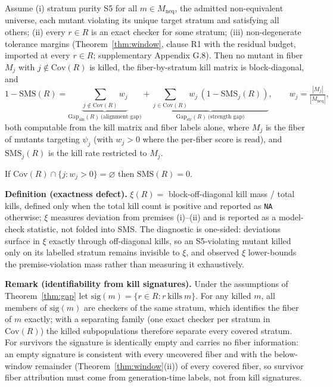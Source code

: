 \documentclass[manuscript,screen,review]{acmart}
\begin{document}
\begin{theorem}\label{thm:gap}
Assume (i) stratum purity S5 for all $m \in M_{\mathrm{neq}}$, the
admitted non-equivalent universe, each mutant violating its unique
target stratum and satisfying all others; (ii) every $r \in R$ is an
exact checker for some stratum; (iii) non-degenerate tolerance margins
(Theorem~\ref{thm:window}, clause R1 with the residual budget, imported
at every $r \in R$; supplementary Appendix G.8). Then no mutant in fiber
$M_j$ with $j \notin \mathrm{Cov}(R)$ is killed, the fiber-by-stratum
kill matrix is block-diagonal, and
\[ 1 - \mathrm{SMS}(R) = \underbrace{\textstyle\sum_{j \notin \mathrm{Cov}(R)} w_j}_{\mathrm{Gap}_{\mathrm{aln}}(R)\ \text{(alignment gap)}}
 + \underbrace{\textstyle\sum_{j \in \mathrm{Cov}(R)} w_j\,(1 - \mathrm{SMS}_j(R))}_{\mathrm{Gap}_{\mathrm{str}}(R)\ \text{(strength gap)}},
 \qquad w_j = \tfrac{|M_j|}{|M_{\mathrm{neq}}|}, \]
both computable from the kill matrix and fiber labels alone, where $M_j$
is the fiber of mutants targeting $\psi_j$ (with $w_j > 0$ where the
per-fiber score is read), and $\mathrm{SMS}_j(R)$ is the kill rate
restricted to $M_j$.
\end{theorem}

\begin{corollary}\label{cor:zero}
If $\mathrm{Cov}(R) \cap \{j : w_j > 0\} = \varnothing$ then
$\mathrm{SMS}(R) = 0$.
\end{corollary}

\textbf{Definition (exactness defect).} $\xi(R) =$ block-off-diagonal
kill mass / total kills, defined only when the total kill count is
positive and reported as \texttt{NA} otherwise; $\xi$ measures deviation
from premises (i)--(ii) and is reported as a model-check statistic, not
folded into SMS. The diagnostic is one-sided: deviations surface in
$\xi$ exactly through off-diagonal kills, so an S5-violating mutant
killed only on its labelled stratum remains invisible to $\xi$, and
observed $\xi$ lower-bounds the premise-violation mass rather than
measuring it exhaustively.

\textbf{Remark (identifiability from kill signatures).} Under the
assumptions of Theorem~\ref{thm:gap} let
$\mathrm{sig}(m) = \{r \in R : r\ \text{kills}\ m\}$. For any killed
$m$, all members of $\mathrm{sig}(m)$ are checkers of the same stratum,
which identifies the fiber of $m$ exactly; with a separating family (one
exact checker per stratum in $\mathrm{Cov}(R)$) the killed
subpopulations therefore separate every covered stratum. For survivors
the signature is identically empty and carries no fiber information: an
empty signature is consistent with every uncovered fiber and with the
below-window remainder (Theorem~\ref{thm:window}(ii)) of every covered
fiber, so survivor fiber attribution must come from generation-time
labels, not from kill signatures.
\end{document}
